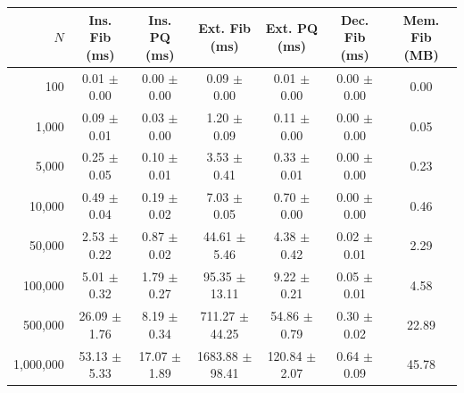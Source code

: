 \begin{tabular}{@{}rcccccc@{}}
\toprule
$N$ & Ins. Fib (ms) & Ins. PQ (ms) & Ext. Fib (ms) & Ext. PQ (ms) & Dec. Fib (ms) & Mem. Fib (MB) \\
\midrule
100 & 0.01 $\pm$ 0.00 & 0.00 $\pm$ 0.00 & 0.09 $\pm$ 0.00 & 0.01 $\pm$ 0.00 & 0.00 $\pm$ 0.00 & 0.00 \\
1,000 & 0.09 $\pm$ 0.01 & 0.03 $\pm$ 0.00 & 1.20 $\pm$ 0.09 & 0.11 $\pm$ 0.00 & 0.00 $\pm$ 0.00 & 0.05 \\
5,000 & 0.25 $\pm$ 0.05 & 0.10 $\pm$ 0.01 & 3.53 $\pm$ 0.41 & 0.33 $\pm$ 0.01 & 0.00 $\pm$ 0.00 & 0.23 \\
10,000 & 0.49 $\pm$ 0.04 & 0.19 $\pm$ 0.02 & 7.03 $\pm$ 0.05 & 0.70 $\pm$ 0.00 & 0.00 $\pm$ 0.00 & 0.46 \\
50,000 & 2.53 $\pm$ 0.22 & 0.87 $\pm$ 0.02 & 44.61 $\pm$ 5.46 & 4.38 $\pm$ 0.42 & 0.02 $\pm$ 0.01 & 2.29 \\
100,000 & 5.01 $\pm$ 0.32 & 1.79 $\pm$ 0.27 & 95.35 $\pm$ 13.11 & 9.22 $\pm$ 0.21 & 0.05 $\pm$ 0.01 & 4.58 \\
500,000 & 26.09 $\pm$ 1.76 & 8.19 $\pm$ 0.34 & 711.27 $\pm$ 44.25 & 54.86 $\pm$ 0.79 & 0.30 $\pm$ 0.02 & 22.89 \\
1,000,000 & 53.13 $\pm$ 5.33 & 17.07 $\pm$ 1.89 & 1683.88 $\pm$ 98.41 & 120.84 $\pm$ 2.07 & 0.64 $\pm$ 0.09 & 45.78 \\
\bottomrule
\end{tabular}
